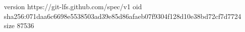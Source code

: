 version https://git-lfs.github.com/spec/v1
oid sha256:071daa6c6698e5538503ad39e85d86afaeb07f9304f128d10e38bd72cf7d7724
size 87536
